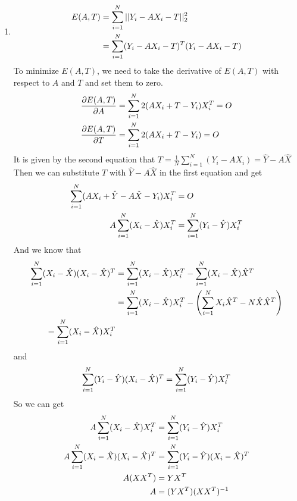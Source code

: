 \documentclass[bwprint]{gmcmthesis}
\numberwithin{figure}{section}
\begin{document}
\begin{enumerate}[label=\alph*.]
    \item 
    \begin{align}
        E(A, T) &= \sum_{i=1}^{N}||Y_i - AX_i - T||_2^2 \notag \\
                &= \sum_{i=1}^{N}(Y_i - AX_i - T)^T(Y_i - AX_i - T) \notag
    \end{align}
    To minimize $E(A, T)$, we need to take the derivative of $E(A, T)$ with respect to $A$ and $T$ and set them to zero.
    \begin{align}
        \frac{\partial E(A, T)}{\partial A} &= \sum_{i=1}^{N}2(AX_i + T - Y_i)X_i^T = O \notag \\
        \frac{\partial E(A, T)}{\partial T} &= \sum_{i=1}^{N}2(AX_i + T - Y_i) = O \notag
    \end{align}
    It is given by the second equation that $T = \frac{1}{N}\sum_{i=1}^{N}(Y_i-AX_i) = \hat{Y} - A\hat{X}$
    Then we can substitute $T$ with $\hat{Y} - A\hat{X}$ in the first equation and get 
    \begin{align}
        \sum_{i=1}^{N}(AX_i + \hat{Y} - A\hat{X} - Y_i)X_i^T &= O \notag \\
        A\sum_{i=1}^{N}(X_i - \hat{X})X_i^T &= \sum_{i=1}^{N}(Y_i - \hat{Y})X_i^T \notag
    \end{align}
    And we know that
    \begin{align}
        \sum_{i=1}^{N}(X_i - \hat{X})(X_i - \hat{X})^T &= \sum_{i=1}^{N}(X_i - \hat{X})X_i^T - \sum_{i=1}^{N}(X_i - \hat{X})\hat{X}^T \notag \\
        &= \sum_{i=1}^{N}(X_i - \hat{X})X_i^T - \left(\sum_{i=1}^{N}X_i\hat{X}^T - N\hat{X}\hat{X}^T\right) \notag \\
        = \sum_{i=1}^{N}(X_i - \hat{X})X_i^T \notag
    \end{align}
    and
    \begin{align}
        \sum_{i=1}^{N}(Y_i - \hat{Y})(X_i - \hat{X})^T = \sum_{i=1}^{N}(Y_i - \hat{Y})X_i^T \notag
    \end{align}
    So we can get
    \begin{align}
        A\sum_{i=1}^{N}(X_i - \hat{X})X_i^T &= \sum_{i=1}^{N}(Y_i - \hat{Y})X_i^T \notag \\
        A\sum_{i=1}^{N}(X_i - \hat{X})(X_i - \hat{X})^T &= \sum_{i=1}^{N}(Y_i - \hat{Y})(X_i - \hat{X})^T \notag \\
        A(XX^T) &= YX^T \notag \\
        A &= (YX^T)(XX^T)^{-1} \notag

\end{align}
\end{enumerate}
\end{document}
